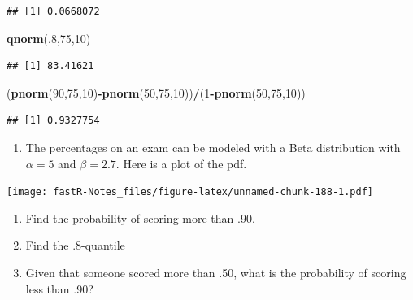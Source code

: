 \documentclass[]{book}
\newenvironment{Shaded}{\begin{snugshade}}{\end{snugshade}}
\newcommand{\KeywordTok}[1]{\textcolor[rgb]{0.13,0.29,0.53}{\textbf{#1}}}
\newcommand{\DecValTok}[1]{\textcolor[rgb]{0.00,0.00,0.81}{#1}}
\newcommand{\OperatorTok}[1]{\textcolor[rgb]{0.81,0.36,0.00}{\textbf{#1}}}
\newcommand{\NormalTok}[1]{#1}
\providecommand{\tightlist}{%
  \setlength{\itemsep}{0pt}\setlength{\parskip}{0pt}}
\theoremstyle{definition}
\theoremstyle{definition}
\theoremstyle{definition}
\theoremstyle{remark}
\begin{document}
\begin{verbatim}
## [1] 0.0668072
\end{verbatim}

\begin{Shaded}
\begin{Highlighting}[]
\KeywordTok{qnorm}\NormalTok{(.}\DecValTok{8}\NormalTok{,}\DecValTok{75}\NormalTok{,}\DecValTok{10}\NormalTok{)}
\end{Highlighting}
\end{Shaded}

\begin{verbatim}
## [1] 83.41621
\end{verbatim}

\begin{Shaded}
\begin{Highlighting}[]
\NormalTok{(}\KeywordTok{pnorm}\NormalTok{(}\DecValTok{90}\NormalTok{,}\DecValTok{75}\NormalTok{,}\DecValTok{10}\NormalTok{)}\OperatorTok{-}\KeywordTok{pnorm}\NormalTok{(}\DecValTok{50}\NormalTok{,}\DecValTok{75}\NormalTok{,}\DecValTok{10}\NormalTok{))}\OperatorTok{/}\NormalTok{(}\DecValTok{1}\OperatorTok{-}\KeywordTok{pnorm}\NormalTok{(}\DecValTok{50}\NormalTok{,}\DecValTok{75}\NormalTok{,}\DecValTok{10}\NormalTok{))}
\end{Highlighting}
\end{Shaded}

\begin{verbatim}
## [1] 0.9327754
\end{verbatim}

\begin{enumerate}
\def\labelenumi{\arabic{enumi})}
\setcounter{enumi}{1}
\tightlist
\item
  The percentages on an exam can be modeled with a Beta distribution
  with \(\alpha = 5\) and \(\beta = 2.7\). Here is a plot of the pdf.
\end{enumerate}

\texttt{[image: fastR-Notes\_files/figure-latex/unnamed-chunk-188-1.pdf]}

\begin{enumerate}
\def\labelenumi{\alph{enumi})}
\tightlist
\item
  Find the probability of scoring more than .90.
\item
  Find the .8-quantile
\item
  Given that someone scored more than .50, what is the probability of
  scoring less than .90?
\end{enumerate}
\end{document}
